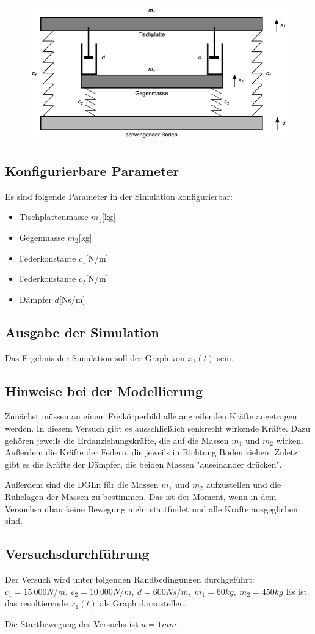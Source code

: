\documentclass[]{scrartcl}
\begin{document}
\begin{figure}[H]
\centering
\includegraphics[width=0.5\linewidth]{./4_Versuchsaufbau}
\caption{}
\label{fig:4_Versuchsaufbau}
\end{figure}

\subsection{Konfigurierbare Parameter}
Es sind folgende Parameter in der Simulation konfigurierbar:
\begin{itemize}
\item Tischplattenmasse $m_{1}$[kg]
\item Gegenmasse $m_{2}$[kg]
\item Federkonstante $c_{1}$[N/m]
\item Federkonstante $c_{2}$[N/m]
\item Dämpfer $d$[Ns/m]
\end{itemize}

\subsection{Ausgabe der Simulation}
Das Ergebnis der Simulation soll der Graph von $x_{1}(t)$ sein.

\subsection{Hinweise bei der Modellierung}
Zunächst müssen an einem Freikörperbild alle angreifenden Kräfte angetragen werden. In diesem Versuch gibt es ausschließlich senkrecht wirkende Kräfte. Dazu gehören jeweils die Erdanziehungskräfte, die auf die Massen $m_{1}$ und $m_{2}$ wirken. Außerdem die Kräfte der Federn, die jeweils in Richtung Boden ziehen. Zuletzt gibt es die Kräfte der Dämpfer, die beiden Massen "auseinander drücken".

Außerdem sind die DGLn für die Massen $m_{1}$ und $m_{2}$ aufzustellen und die Ruhelagen der Massen zu bestimmen. Das ist der Moment, wenn in dem Versuchsaufbau keine Bewegung mehr stattfindet und alle Kräfte ausgeglichen sind.

\subsection{Versuchsdurchführung}
Der Versuch wird unter folgenden Randbedingungen durchgeführt: $c_{1} = 15\ 000N/m,\ c_{2}=10\ 000N/m,\ d=600Ns/m,\ m_{1}=60kg,\ m_{2}=450kg$
Es ist das resultierende $x_{1}(t)$ als Graph darzustellen.

Die Startbewegung des Versuchs ist $u=1mm$.
\end{document}
